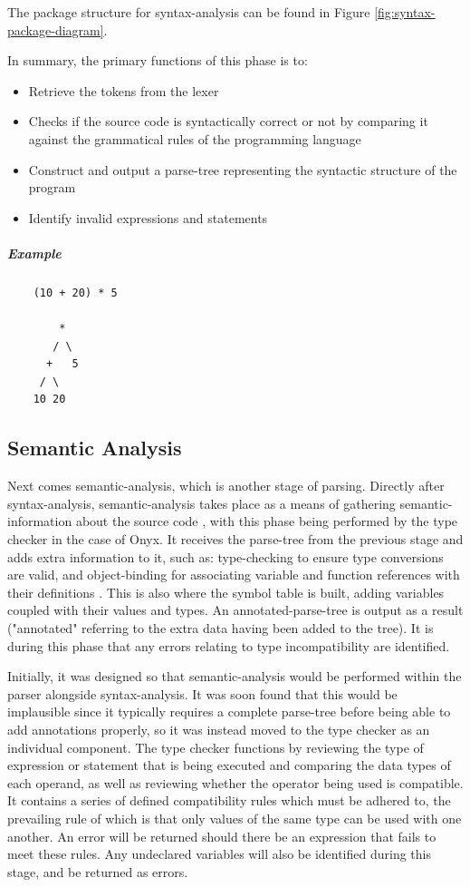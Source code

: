 \documentclass[
]{report}
\begin{document}
The package structure for \gls{syntax-analysis} can be found in Figure \ref{fig:syntax-package-diagram}.

In summary, the primary functions of this phase is to:
\begin{itemize}
	\item Retrieve the \glspl{token} from the lexer
	\item Checks if the source code is syntactically correct or not by comparing it against the grammatical rules of the programming language
	\item Construct and output a \gls{parse-tree} representing the syntactic structure of the program
	\item Identify invalid \glspl{expression} and \glspl{statement}
\end{itemize}

\subparagraph{Example}
\begin{verbatim}
	(10 + 20) * 5
	
	    *
	   / \
	  +   5
	 / \  
	10 20
\end{verbatim}

\subsection{Semantic Analysis}
Next comes \gls{semantic-analysis}, which is another stage of \gls{parsing}.
Directly after \gls{syntax-analysis}, \gls{semantic-analysis} takes place as a means
of gathering \gls{semantic-information} about the source code \cite{semantics-wiki}, with
this phase being performed by the type checker in the case of Onyx. It
receives the \gls{parse-tree} from the previous stage and adds extra
information to it, such as: \gls{type-checking} to ensure type conversions are
valid, and \gls{object-binding} for associating variable and function
references with their definitions \cite{compiler-wiki}. This is also where the \gls{symbol}
table is built, adding variables coupled with their values and types. An
\gls{annotated-parse-tree} is output as a result ("annotated" referring to the
extra data having been added to the tree). It is during this phase that
any errors relating to type incompatibility are identified.

Initially, it was designed so that \gls{semantic-analysis} would be performed
within the parser alongside \gls{syntax-analysis}. It was soon found that this
would be implausible since it typically requires a complete \gls{parse-tree}
before being able to add annotations properly, so it was instead moved
to the type checker as an individual component. The type checker
functions by reviewing the type of \gls{expression} or \gls{statement} that is being
executed and comparing the data types of each operand, as well as
reviewing whether the operator being used is compatible. It contains a
series of defined compatibility rules which must be adhered to, the
prevailing rule of which is that only values of the same type can be
used with one another. An error will be returned should there be an
\gls{expression} that fails to meet these rules. Any undeclared variables will
also be identified during this stage, and be returned as errors.
\end{document}
